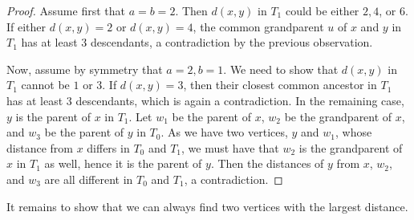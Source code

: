 \documentclass[12pt,a4paper]{amsart}
\theoremstyle{plain}
\theoremstyle{definition}
\begin{document}
\begin{proof}
Assume first that $a=b=2$. Then $d(x,y)$ in $T_1$ could be either $2,4$, or $6$. If either $d(x,y)=2$ or $d(x,y)=4$, the common grandparent $u$ of $x$ and $y$ in $T_1$ has at least $3$ descendants, a contradiction by the previous observation.

Now, assume by symmetry that $a=2, b=1$. We need to show that $d(x,y)$ in $T_1$ cannot be $1$ or $3$. If $d(x,y)=3$, then their closest common ancestor in $T_1$ has at least $3$ descendants, which is again a contradiction. In the remaining case, $y$ is the parent of $x$ in $T_1$. Let $w_1$ be the parent of $x$, $w_2$ be the grandparent of $x$, and $w_3$ be the parent of $y$ in $T_0$. As we have two vertices, $y$ and $w_1$, whose distance from $x$ differs in $T_0$ and $T_1$, we must have that $w_2$ is the grandparent of $x$ in $T_1$ as well, hence it is the parent of $y$. Then the distances of $y$ from $x$, $w_2$, and $w_3$ are all different in $T_0$ and $T_1$, a contradiction.
\end{proof}

It remains to show that we can always find two vertices with the largest distance.
\end{document}
